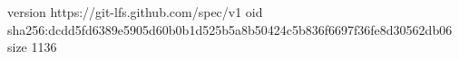 version https://git-lfs.github.com/spec/v1
oid sha256:dcdd5fd6389e5905d60b0b1d525b5a8b50424c5b836f6697f36fe8d30562db06
size 1136

